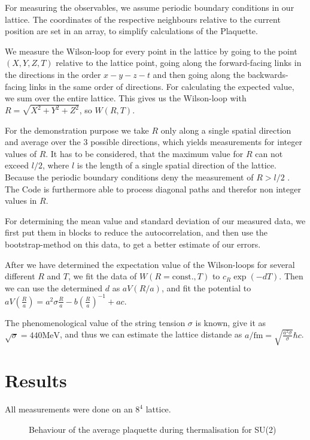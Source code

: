 \documentclass[%
 reprint,
 amsmath,amssymb,
 aps,
]{revtex4-1}
\begin{document}
For measuring the observables, we assume periodic boundary conditions in our lattice. The coordinates of the respective neighbours relative to the current position are set in an array, to simplify calculations of the Plaquette.

We measure the Wilson-loop for every point in the lattice by going to the point $(X,Y,Z,T)$ relative to the lattice point, going along the forward-facing links in the directions in the order $x-y-z-t$ and then going along the backwards-facing links in the same order of directions. For calculating the expected value, we sum over the entire lattice. This gives us the Wilson-loop with $R=\sqrt{X^2+Y^2+Z^2}$, so $W(R, T)$. 

For the demonstration purpose we take $R$ only along a single spatial direction and average over the $3$ possible directions, which yields measurements for integer values of $R$. It has to be considered, that the maximum value for $R$ can not exceed $l/2$, where $l$ is the length of a single spatial direction of the lattice. Because the periodic boundary conditions deny the measurement of $R>l/2$ .
The Code is furthermore able to process diagonal paths and therefor non integer values in $R$. 

For determining the mean value and standard deviation of our measured data, we first put them in blocks to reduce the autocorrelation, and then use the bootstrap-method on this data, to get a better estimate of our errors.

After we have determined the expectation value of the Wilson-loops for several different $R$ and $T$, we fit the data of $W(R=\text{const.}, T)$ to $c_R\exp(-dT)$. Then we can use the determined $d$ as $aV(R/a)$, and fit the potential to $aV\left(\frac{R}{a}\right)=a^2\sigma \frac{R}{a}-b\left(\frac{R}{a}\right)^{-1}+ac$.

The phenomenological value of the string tension $\sigma$ is known, \citet{Cardoso_2011} give it as $\sqrt{\sigma}=440\si{\mega\electronvolt}$, and thus we can estimate the lattice distande as $a/\si{\femto\meter}=\sqrt{\frac{a^2\sigma}{\sigma}}\hbar c$.

\section{Results}

All measurements were done on an $8^4$ lattice.

 \begin{figure}
 	\centering

\caption[Behaviour of the plaquette for SU(2)]{Behaviour of the average plaquette during thermalisation for SU(2)}
\label{fig:comparisoncreutz}
\end{figure} 
\end{document}
